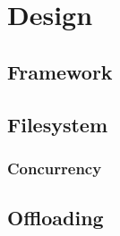 
\chapter{Design} %



\ifpdf
    \graphicspath{{7/figures/PNG/}{7/figures/PDF/}{7/figures/}}
\else
    \graphicspath{{7/figures/EPS/}{7/figures/}}
\fi


% 

\section{Framework}


\section{Filesystem}




\subsection{Concurrency}

\section{Offloading}


